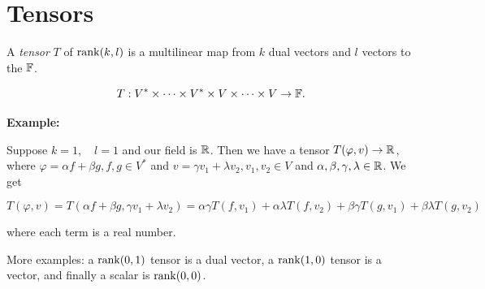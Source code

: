 \chapter{Tensors}

A \emph{tensor} \(T\) of \(\mathrm{rank}(k,l)\) is a multilinear map from \(k\) dual vectors and \(l\)
vectors to the \(\mathbb{F}\).

\[
    T: V^* \times \dots \times V^* \times V \times \dots \times V \to \mathbb{F}.
\]

\textbf{Example:}

Suppose \(k = 1, \quad l = 1\) and our field is \(\mathbb{R}\). Then we have a tensor \(T(\varphi, v) \to \mathbb{R}\), where 
\(\varphi = \alpha f + \beta g, f,g \in V^*\) and \(v = \gamma v_1 + \lambda v_2, v_1, v_2 \in V\) and \(\alpha, \beta, \gamma, 
\lambda \in \mathbb{R}\). We get 

\[
    T(\varphi, v) = T(\alpha f + \beta g, \gamma v_1 + \lambda v_2) = \alpha\gamma T(f, v_1) + \alpha\lambda T(f, v_2) + \beta \gamma T(g, v_1) + \beta \lambda T(g, v_2)
\]

where each term is a real number.

More examples: a \(\mathrm{rank}(0, 1)\) tensor is a dual vector, a \(\mathrm{rank}(1, 0)\) tensor is a vector, and finally a scalar 
is \(\mathrm{rank}(0, 0)\).